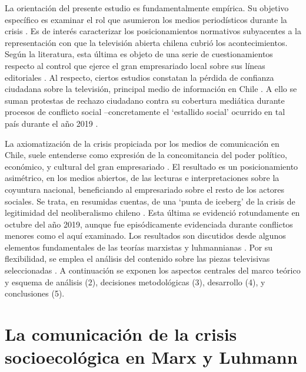 \documentclass{textolivre}
\begin{document}
La orientación del presente estudio es fundamentalmente empírica. Su objetivo
específico es examinar el rol que asumieron los medios periodísticos durante la crisis
\cite{Mascareo2018b}. Es de interés caracterizar los posicionamientos normativos
subyacentes a la representación con que la televisión abierta chilena cubrió los
acontecimientos. Según la literatura, esta última es objeto de una serie de
cuestionamientos respecto al control que ejerce el gran empresariado local sobre sus
líneas editoriales \cite{cardenas2019,sapiezynska2013}. Al
respecto, ciertos estudios constatan la pérdida de confianza ciudadana sobre la televisión,
principal medio de información en Chile \cite{newman2019}. A ello se suman
protestas de rechazo ciudadano contra su cobertura mediática durante procesos de
conflicto social --concretamente el ‘estallido social’ ocurrido en tal país durante el año
2019 \cite{almeida}.

La axiomatización de la crisis propiciada por los medios de comunicación en Chile,
suele entenderse como expresión de la concomitancia del poder político, económico, y
cultural del gran empresariado \cite[p. 371--395]{palet}. El resultado es un
posicionamiento asimétrico, en los medios abiertos, de las lecturas e interpretaciones
sobre la coyuntura nacional, beneficiando al empresariado sobre el resto de los actores
sociales. Se trata, en resumidas cuentas, de una ‘punta de iceberg’ de la crisis de
legitimidad del neoliberalismo chileno \cite{solimano}. Esta última se evidenció
rotundamente en octubre del año 2019, aunque fue episódicamente evidenciada durante
conflictos menores como el aquí examinado. Los resultados son discutidos desde algunos
elementos fundamentales de las teorías marxistas y luhmannianas \cite{Luhmann1984,marx2003,marx2010,Mascareo2018,wallerstein}.
Por su
flexibilidad, se emplea el análisis del contenido \cite{strauss2002} sobre las
piezas televisivas seleccionadas \cite{eiroa2017,MartnezSalgado2012}. 
A continuación se exponen los aspectos centrales del marco teórico y
esquema de análisis (2), decisiones metodológicas (3), desarrollo (4), y conclusiones (5).


\section{La comunicación de la crisis socioecológica en Marx y Luhmann}\label{sec-lacom}
\end{document}
